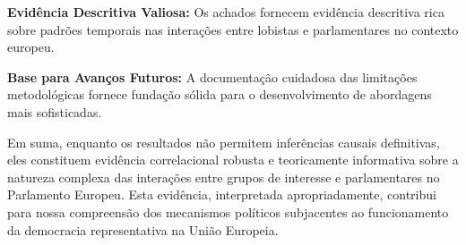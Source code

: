 \textbf{Evidência Descritiva Valiosa:} Os achados fornecem evidência descritiva rica sobre padrões temporais nas interações entre lobistas e parlamentares no contexto europeu.

\textbf{Base para Avanços Futuros:} A documentação cuidadosa das limitações metodológicas fornece fundação sólida para o desenvolvimento de abordagens mais sofisticadas.

Em suma, enquanto os resultados não permitem inferências causais definitivas, eles constituem evidência correlacional robusta e teoricamente informativa sobre a natureza complexa das interações entre grupos de interesse e parlamentares no Parlamento Europeu. Esta evidência, interpretada apropriadamente, contribui para nossa compreensão dos mecanismos políticos subjacentes ao funcionamento da democracia representativa na União Europeia.

    \label{tab:robustness_specifications}
    
